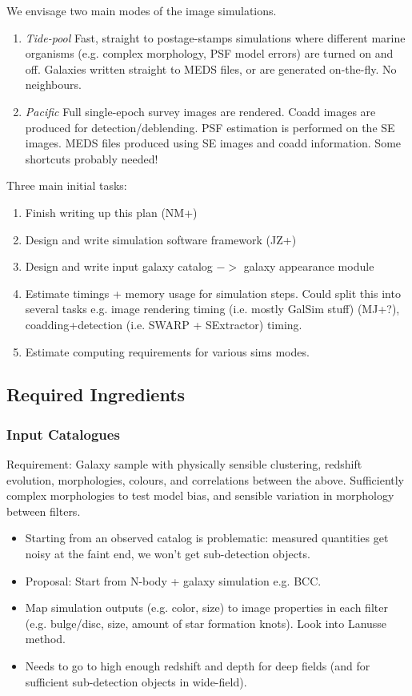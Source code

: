 \documentclass[\docopts]{\docclass}
\begin{document}
We envisage two main modes of the image simulations. 
\begin{enumerate}
\item \emph{Tide-pool} Fast, straight to postage-stamps simulations where different marine organisms (e.g. complex morphology, PSF model errors) are turned on and off. Galaxies written straight to MEDS files, or are generated on-the-fly. No neighbours.
\item \emph{Pacific} Full single-epoch survey images are rendered. Coadd images are produced for detection/deblending. PSF estimation is performed on the SE images. MEDS files produced using SE images and coadd information. Some shortcuts probably needed!
\end{enumerate}

Three main initial tasks:
\begin{enumerate}
\item{Finish writing up this plan (NM+)}
\item{Design and write simulation software framework (JZ+)}
\item{Design and write input galaxy catalog 
$->$ galaxy appearance module}
\item{Estimate timings + memory usage for simulation steps. Could split this into several tasks e.g. image rendering timing (i.e. mostly GalSim stuff) (MJ+?), coadding+detection (i.e. SWARP + SExtractor) timing.}
\item{Estimate computing requirements for various sims modes.}
\end{enumerate}

\subsection{Required Ingredients}

\subsubsection{Input Catalogues}

Requirement: Galaxy sample with physically sensible clustering, redshift evolution, morphologies, colours, and correlations between the above. Sufficiently complex morphologies to test model bias, and sensible variation in morphology between filters. 

\begin{itemize}
\item Starting from an observed catalog is problematic: measured quantities get noisy at the faint end, we won't get sub-detection objects.
\item Proposal: Start from N-body + galaxy simulation e.g. BCC.
\item Map simulation outputs (e.g. color, size) to image properties in each filter (e.g. bulge/disc, size, amount of star formation knots). Look into Lanusse method.
\item Needs to go to high enough redshift and depth for deep fields (and for sufficient sub-detection objects in wide-field).
\end{itemize}
\end{document}
